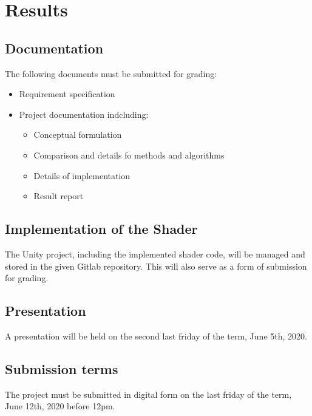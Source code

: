 \section{Results}

\subsection{Documentation}
The following documents must be submitted for grading:
\begin{itemize}
    \item Requirement specification
    \item Project documentation indcluding:
    \begin{itemize}
        \item Conceptual formulation
        \item Comparison and details fo methods and algorithms
        \item Details of implementation
        \item Result report
    \end{itemize}
\end{itemize}

\subsection{Implementation of the Shader}
The Unity project, including the implemented shader code, will be managed and stored in the given Gitlab repository\cite{gitlab}. This will also serve as a form of submission for grading.

\subsection{Presentation}
A presentation will be held on the second last friday of the term, June 5th, 2020.

\subsection{Submission terms}
The project must be submitted in digital form on the last friday of the term, June 12th, 2020 before 12pm.
